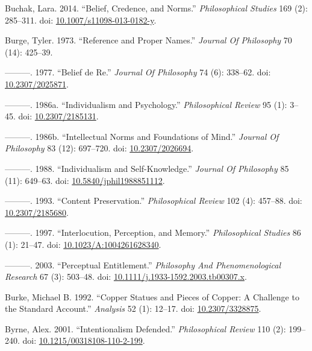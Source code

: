 \documentclass[
  10pt,
  letterpaper,
  DIV=11,
  numbers=noendperiod,
  twoside]{scrartcl}
\newlength{\cslhangindent}
\newenvironment{CSLReferences}[2] %
 {\begin{list}{}{%
  \setlength{\itemindent}{0pt}
  \setlength{\leftmargin}{0pt}
  \setlength{\parsep}{0pt}
  \ifodd #1
   \setlength{\leftmargin}{\cslhangindent}
   \setlength{\itemindent}{-1\cslhangindent}
  \fi
  \setlength{\itemsep}{#2\baselineskip}}}
 {\end{list}}
\begin{document}
\begin{CSLReferences}{1}{0}
Buchak, Lara. 2014. {``Belief, Credence, and Norms.''}
\emph{Philosophical Studies} 169 (2): 285--311. doi:
\href{https://doi.org/10.1007/s11098-013-0182-y}{10.1007/s11098-013-0182-y}.

Burge, Tyler. 1973. {``Reference and Proper Names.''} \emph{Journal Of
Philosophy} 70 (14): 425--39.

---------. 1977. {``Belief de Re.''} \emph{Journal Of Philosophy} 74
(6): 338--62. doi:
\href{https://doi.org/10.2307/2025871}{10.2307/2025871}.

---------. 1986a. {``Individualism and Psychology.''}
\emph{Philosophical Review} 95 (1): 3--45. doi:
\href{https://doi.org/10.2307/2185131}{10.2307/2185131}.

---------. 1986b. {``Intellectual Norms and Foundations of Mind.''}
\emph{Journal Of Philosophy} 83 (12): 697--720. doi:
\href{https://doi.org/10.2307/2026694}{10.2307/2026694}.

---------. 1988. {``Individualism and Self-Knowledge.''} \emph{Journal
Of Philosophy} 85 (11): 649--63. doi:
\href{https://doi.org/10.5840/jphil1988851112}{10.5840/jphil1988851112}.

---------. 1993. {``Content Preservation.''} \emph{Philosophical Review}
102 (4): 457--88. doi:
\href{https://doi.org/10.2307/2185680}{10.2307/2185680}.

---------. 1997. {``Interlocution, Perception, and Memory.''}
\emph{Philosophical Studies} 86 (1): 21--47. doi:
\href{https://doi.org/10.1023/A:1004261628340}{10.1023/A:1004261628340}.

---------. 2003. {``Perceptual Entitlement.''} \emph{Philosophy And
Phenomenological Research} 67 (3): 503--48. doi:
\href{https://doi.org/10.1111/j.1933-1592.2003.tb00307.x}{10.1111/j.1933-1592.2003.tb00307.x}.

Burke, Michael B. 1992. {``Copper Statues and Pieces of Copper: A
Challenge to the Standard Account.''} \emph{Analysis} 52 (1): 12--17.
doi: \href{https://doi.org/10.2307/3328875}{10.2307/3328875}.

Byrne, Alex. 2001. {``Intentionalism Defended.''} \emph{Philosophical
Review} 110 (2): 199--240. doi:
\href{https://doi.org/10.1215/00318108-110-2-199}{10.1215/00318108-110-2-199}.


\end{CSLReferences}
\end{document}

